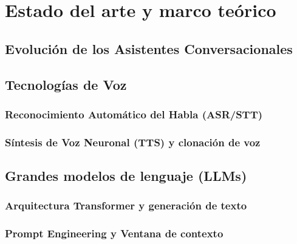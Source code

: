 \chapter{\textbf{Estado del arte y marco teórico}}
\label{ch:EstadoArte}
\thispagestyle{fancy}

\section{Evolución de los Asistentes Conversacionales}
\label{sec:evolucion_asistentes}

\textoBase

\textoBaseAlt

\section{Tecnologías de Voz}
\label{sec:tecnologias_voz}

\textoBase

\subsection{Reconocimiento Automático del Habla (ASR/STT)}
\label{subsec:asr_stt}

\textoBaseAlt

\subsection{Síntesis de Voz Neuronal (TTS) y clonación de voz}
\label{subsec:tts_clonacion}

\textoBase

\section{Grandes modelos de lenguaje (LLMs)}
\label{sec:llms}

\textoBase

\subsection{Arquitectura Transformer y generación de texto}
\label{subsec:transformer_generacion}

\textoBaseAlt

\subsection{Prompt Engineering y Ventana de contexto}
\label{subsec:prompt_engineering}

